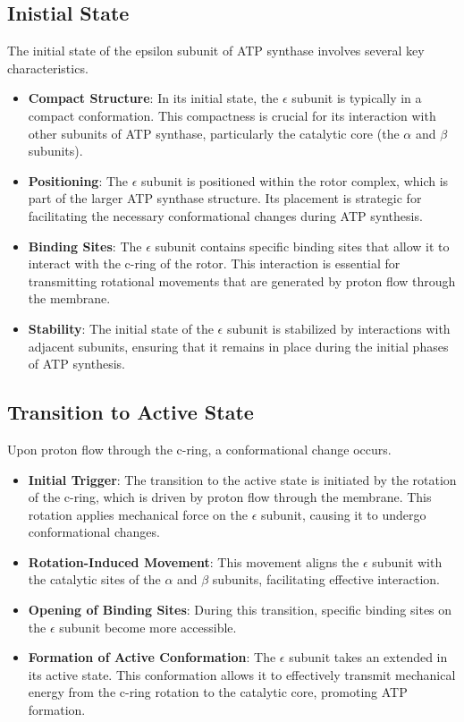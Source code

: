 \documentclass{article}
\begin{document}
\subsection{Inistial State}

The initial state of the epsilon subunit of ATP synthase involves several key characteristics.

\begin{itemize}
    \item  \textbf{Compact Structure}: In its initial state, the $\epsilon$ subunit is typically in a compact conformation. This compactness is crucial for its interaction with other subunits of ATP synthase, particularly the catalytic core (the $\alpha$ and $\beta$ subunits).
    \item \textbf{Positioning}: The $\epsilon$ subunit is positioned within the rotor complex, which is part of the larger ATP synthase structure. Its placement is strategic for facilitating the necessary conformational changes during ATP synthesis.
    \item \textbf{Binding Sites}: The $\epsilon$ subunit contains specific binding sites that allow it to interact with the c-ring of the rotor. This interaction is essential for transmitting rotational movements that are generated by proton flow through the membrane.
    \item \textbf{Stability}: The initial state of the $\epsilon$ subunit is stabilized by interactions with adjacent subunits, ensuring that it remains in place during the initial phases of ATP synthesis.
\end{itemize}

\subsection{Transition to Active State}

Upon proton flow through the c-ring, a conformational change occurs.

\begin{itemize}
    \item  \textbf{Initial Trigger}: The transition to the active state is initiated by the rotation of the c-ring, which is driven by proton flow through the membrane. This rotation applies mechanical force on the $\epsilon$ subunit, causing it to undergo conformational changes.
    \item  \textbf{Rotation-Induced Movement}: This movement aligns the $\epsilon$ subunit with the catalytic sites of the $\alpha$ and $\beta$ subunits, facilitating effective interaction.
    \item  \textbf{Opening of Binding Sites}: During this transition, specific binding sites on the $\epsilon$ subunit become more accessible.
    \item \textbf{Formation of Active Conformation}: The $\epsilon$ subunit takes an extended in its active state. This conformation allows it to effectively transmit mechanical energy from the c-ring rotation to the catalytic core, promoting ATP formation.
\end{itemize}
\end{document}
